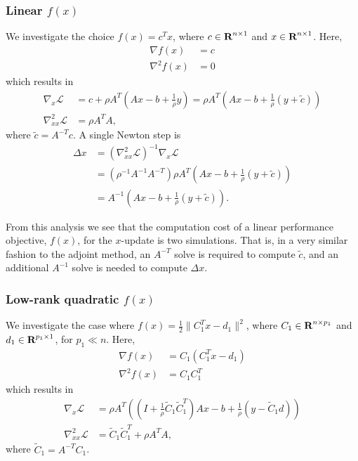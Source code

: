 \documentclass{article}
\newcommand{\inv}[1]{\frac{1}{#1}}
\newcommand{\tC}{\tilde{C}}
\begin{document}
\subsubsection{Linear $f(x)$}
We investigate the choice $f(x) = c^T x$, 
    where $c \in {\mbox{\bf R}}^{n \times 1}$
    and $x \in {\mbox{\bf R}}^{n \times 1}$.
Here,
    \begin{subequations}\begin{align}
    \nabla f(x) &= c \\
    \nabla^2 f(x) &= 0
    \end{align}\end{subequations}
    which results in
    \begin{subequations}\begin{align}
    \nabla_x \mathcal{L} &= c + \rho A^T (A x - b + \inv{\rho} y) 
        = \rho A^T (Ax - b + \inv{\rho}(y + \tilde{c})) \\
    \nabla_{xx}^2 \mathcal{L} &= \rho A^T A,
    \end{align}\end{subequations}
    where $\tilde{c} = A^{-T} c$.
A single Newton step is
    \begin{equation}\begin{split}
    \Delta x &= (\nabla_{xx}^2 \mathcal{L})^{-1} \nabla_x \mathcal{L} \\
        &= (\rho^{-1} A^{-1} A^{-T}) 
            \rho A^T (A x - b + \inv{\rho}(y + \tilde c)) \\
        &= A^{-1}(A x - b + \inv{\rho}(y + \tilde c)).
    \end{split}\end{equation}

From this analysis we see that 
    the computation cost of a linear performance objective, $f(x)$, 
    for the $x$-update is two simulations.
That is, in a very similar fashion to the adjoint method,
    an $A^{-T}$ solve is required to compute $\tilde{c}$,
    and an additional $A^{-1}$ solve is needed to compute $\Delta x$.

\subsubsection{Low-rank quadratic $f(x)$}
We investigate the case where $f(x) = \frac{1}{2}\|C_1^T x - d_1\|^2$,
    where $C_1 \in {\mbox{\bf R}}^{n \times p_1}$
    and $d_1 \in {\mbox{\bf R}}^{p_1 \times 1}$, for $p_1 \ll n$.
Here,
    \begin{subequations}\begin{align}
    \nabla f(x) &= C_1 (C_1^T x - d_1) \\
    \nabla^2 f(x) &= C_1 C_1^T
    \end{align}\end{subequations}
    which results in
    \begin{subequations}\begin{align}
    \nabla_x \mathcal{L} &= \rho A^T ((I + \inv{\rho}\tC_1\tC_1^T)Ax
        - b + \inv{\rho}(y - \tC_1 d)) \\
    \nabla_{xx}^2 \mathcal{L} &= \tC_1\tC_1^T + \rho A^T A,
    \end{align}\end{subequations}
    where $\tC_1 = A^{-T}C_1$.
\end{document}
